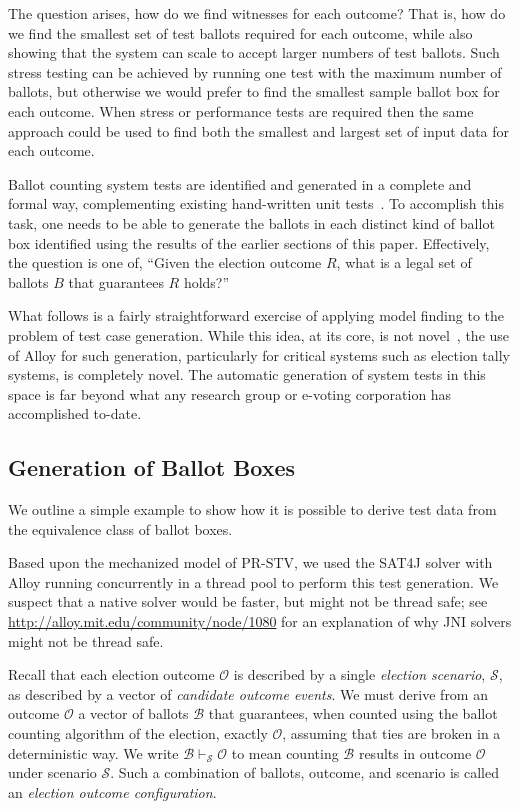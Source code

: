\documentclass[runningheads,a4paper]{llncs}
\newcommand{\outcome}{\ensuremath{\mathcal{O}}\xspace}
\newcommand{\scenario}{\ensuremath{\mathcal{S}}\xspace}
\newcommand{\ballots}{\ensuremath{\mathcal{B}}\xspace}
\newcommand{\config}{\ensuremath{\ballots \vdash_\scenario \outcome}\xspace}
\begin{document}
The question arises, how do we find witnesses for each outcome?  That
is, how do we find the smallest set of test ballots required for each
outcome, while also showing that the system can scale to accept larger
numbers of test ballots.  Such stress testing can be achieved by
running one test with the maximum number of ballots, but otherwise we
would prefer to find the smallest sample ballot box for each outcome.
When stress or performance tests are required then the same approach
could be used to find both the smallest and largest set of input data
for each outcome.

Ballot counting system tests are identified and generated in a
complete and formal way, complementing existing hand-written unit
tests~\cite{EVT07}.  To accomplish this task, one needs to be able to
generate the ballots in each distinct kind of ballot box identified
using the results of the earlier sections of this paper.  Effectively,
the question is one of, ``Given the election outcome $R$, what is a
legal set of ballots $B$ that guarantees $R$ holds?''

What follows is a fairly straightforward exercise of applying model
finding to the problem of test case generation.  While this idea, at
its core, is not novel~\cite{RayadurgamHeimdahl01}, the use of Alloy
for such generation, particularly for critical systems such as
election tally systems, is completely novel.  The automatic generation
of system tests in this space is far beyond what any research group or
e-voting corporation has accomplished to-date.

\subsection{Generation of Ballot Boxes}

We outline a simple example to show how it is possible to derive test
data from the equivalence class of ballot boxes.

Based upon the mechanized model of PR-STV, we used the SAT4J solver
with Alloy running concurrently in a thread pool to perform this test
generation.  We suspect that a native solver would be faster, but
might not be thread safe; see
\url{http://alloy.mit.edu/community/node/1080} for an explanation of
why JNI solvers might not be thread safe.

Recall that each election outcome \outcome is described by a single
\emph{election scenario}, \scenario, as described by a vector of
\emph{candidate outcome events}.  We must derive from an outcome
\outcome a vector of ballots \ballots that guarantees, when counted
using the ballot counting algorithm of the election, exactly \outcome,
assuming that ties are broken in a deterministic way.  We write
\config to mean counting \ballots results in outcome \outcome under
scenario \scenario.  Such a combination of ballots, outcome, and
scenario is called an \emph{election outcome configuration}.
\end{document}

